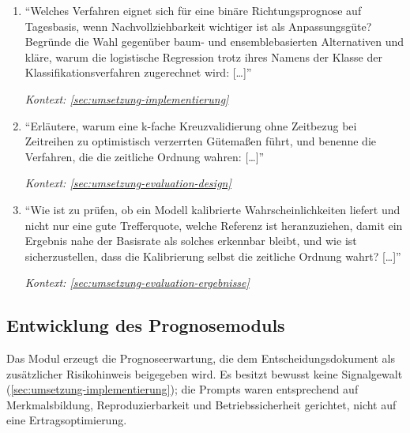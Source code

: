 \begin{enumerate}
    \item \enquote{Welches Verfahren eignet sich für eine binäre
            Richtungsprognose auf Tagesbasis, wenn Nachvollziehbarkeit
            wichtiger ist als Anpassungsgüte? Begründe die Wahl gegenüber
            baum- und ensemblebasierten Alternativen und kläre, warum die
            logistische Regression trotz ihres Namens der Klasse der
            Klassifikationsverfahren zugerechnet wird: [\dots]}
            \par\hfill\textit{Kontext: \cref{sec:umsetzung-implementierung}}

    \item \enquote{Erläutere, warum eine k-fache Kreuzvalidierung ohne
            Zeitbezug bei Zeitreihen zu optimistisch verzerrten Gütemaßen
            führt, und benenne die Verfahren, die die zeitliche Ordnung
            wahren: [\dots]}
            \par\hfill\textit{Kontext:
            \cref{sec:umsetzung-evaluation-design}}

    \item \enquote{Wie ist zu prüfen, ob ein Modell kalibrierte
            Wahrscheinlichkeiten liefert und nicht nur eine gute Trefferquote,
            welche Referenz ist heranzuziehen, damit ein Ergebnis nahe der
            Basisrate als solches erkennbar bleibt, und wie ist
            sicherzustellen, dass die Kalibrierung selbst die zeitliche
            Ordnung wahrt? [\dots]}
            \par\hfill\textit{Kontext:
            \cref{sec:umsetzung-evaluation-ergebnisse}}
\end{enumerate}

\subsection{Entwicklung des Prognosemoduls}
\label{sec:prompts-fable-mlforecast}

Das Modul erzeugt die Prognoseerwartung, die dem Entscheidungsdokument als
zusätzlicher Risikohinweis beigegeben wird. Es besitzt bewusst keine
Signalgewalt (\cref{sec:umsetzung-implementierung}); die Prompts waren
entsprechend auf Merkmalsbildung, Reproduzierbarkeit und Betriebssicherheit
gerichtet, nicht auf eine Ertragsoptimierung.

